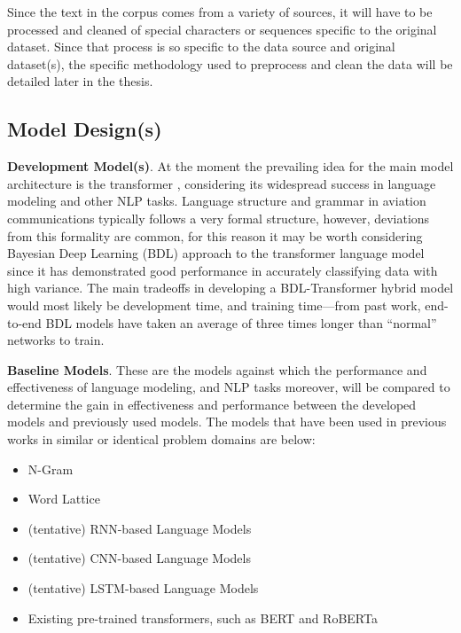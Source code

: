 \documentclass[10pt]{article}
\begin{document}
        Since the text in the corpus comes from a variety of sources, it will have to be processed and cleaned of special characters
        or sequences specific to the original dataset. Since that process is so specific to the data source and original dataset(s),
        the specific methodology used to preprocess and clean the data will be detailed later in the thesis.

        \subsection{Model Design(s)}
        \textbf{Development Model(s)}. At the moment the prevailing idea for the main model architecture is the transformer
        \cite{vaswani_attention_2017}, considering its widespread success in language modeling and other NLP tasks. Language structure
        and grammar in aviation communications typically follows a very formal structure, however, deviations from this formality are
        common, for this reason it may be worth considering Bayesian Deep Learning (BDL) approach to the transformer language model
        since it has demonstrated good performance in accurately classifying data with high variance. The main tradeoffs in developing
        a BDL-Transformer hybrid model would most likely be development time, and training time---from past work, end-to-end BDL models
        have taken an average of three times longer than ``normal'' networks to train.


        \textbf{Baseline Models}. These are the models against which the performance and effectiveness of language modeling, and NLP
        tasks moreover, will be compared to determine the gain in effectiveness and performance between the developed models and
        previously used models. The models that have been used in previous works in similar or identical problem domains are below:

        \begin{multicols}{2}
            \begin{itemize}
                \item N-Gram
                \item Word Lattice
                \item (tentative) RNN-based Language Models
                \item (tentative) CNN-based Language Models
                \item (tentative) LSTM-based Language Models
                \item Existing pre-trained transformers, such as BERT and RoBERTa
            \end{itemize}
        \end{multicols}
\end{document}
